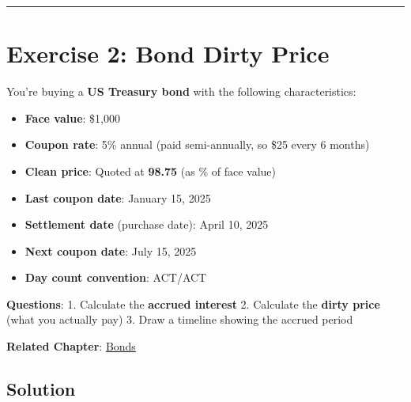 \documentclass[
  letterpaper,
]{scrbook}
\providecommand{\tightlist}{%
  \setlength{\itemsep}{0pt}\setlength{\parskip}{0pt}}
\begin{document}
\begin{center}\rule{0.5\linewidth}{0.5pt}\end{center}

\section{Exercise 2: Bond Dirty
Price}\label{exercise-2-bond-dirty-price}

\begin{tcolorbox}[enhanced jigsaw, toptitle=1mm, colbacktitle=quarto-callout-note-color!10!white, opacityback=0, leftrule=.75mm, breakable, colframe=quarto-callout-note-color-frame, toprule=.15mm, opacitybacktitle=0.6, coltitle=black, bottomrule=.15mm, colback=white, arc=.35mm, titlerule=0mm, rightrule=.15mm, left=2mm, title=\textcolor{quarto-callout-note-color}{\faInfo}\hspace{0.5em}{Problem}, bottomtitle=1mm]

You're buying a \textbf{US Treasury bond} with the following
characteristics:

\begin{itemize}
\tightlist
\item
  \textbf{Face value}: \$1,000
\item
  \textbf{Coupon rate}: 5\% annual (paid semi-annually, so \$25 every 6
  months)
\item
  \textbf{Clean price}: Quoted at \textbf{98.75} (as \% of face value)
\item
  \textbf{Last coupon date}: January 15, 2025
\item
  \textbf{Settlement date} (purchase date): April 10, 2025
\item
  \textbf{Next coupon date}: July 15, 2025
\item
  \textbf{Day count convention}: ACT/ACT
\end{itemize}

\textbf{Questions}: 1. Calculate the \textbf{accrued interest} 2.
Calculate the \textbf{dirty price} (what you actually pay) 3. Draw a
timeline showing the accrued period

\textbf{Related Chapter}: \hyperref[bonds]{Bonds}

\end{tcolorbox}

\subsection*{Solution}\label{solution-1}
\end{document}
